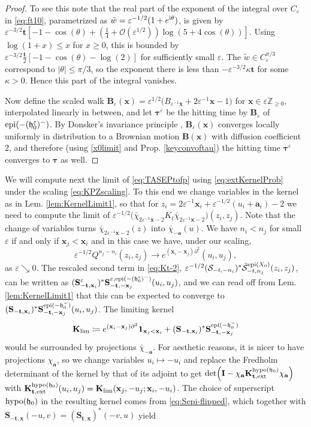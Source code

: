 \documentclass[letterpaper,reqno,11pt,oneside,final]{amsart}
\theoremstyle{definition}
\newcommand{\fh}{\mathfrak{h}}
\newcommand{\I}{\uptext{i}}
\newcommand{\zz}{\mathbb{Z}}
\newcommand{\p}{\partial}
\newcommand{\uno}[1]{\mathbf{1}_{#1}}
\newcommand{\ep}{\varepsilon}
\newcommand{\uptext}[1]{\text{\upshape{#1}}}
\DeclareMathOperator{\epi}{\uptext{epi}}
\DeclareMathOperator{\oepi}{\epi}
\DeclareMathOperator{\hypo}{\uptext{hypo}}
\newcommand{\SM}{\mathcal{S}}
\newcommand{\SN}{\bar{\mathcal{S}}}
\newcommand{\fT}{\mathbf{S}}
\newcommand{\ft}{\mathbf{t}}
\newcommand{\fx}{\mathbf{x}}
\newcommand{\fa}{\mathbf{a}}
\newcommand{\fB}{\mathbf{B}}
\newcommand{\fK}{\mathbf{K}}
\newcommand{\fI}{\mathbf{I}}
\newcommand{\ftau}{\bm{\tau}}
\numberwithin{equation}{section}
\begin{document}
\begin{proof}
To see this note that the real part of the exponent of the integral over $C_\ep$ in \eqref{eq:ft10}, parametrized as $\tilde w=\ep^{-1/2}(1+e^{\I\theta})$, is given by $\ep^{-3/2}\ft[-1-\cos(\theta) + (\tfrac14+\mathcal{O}(\ep^{1/2}))\log(5+4\cos(\theta))]$.
Using $\log(1+x) \le x$ for $x\ge 0$, this is bounded by $\ep^{-3/2}\tfrac{\ft}2[-1-\cos(\theta)-\log(2)]$ for sufficiently small $\ep$.
The $\tilde{w}\in C^{\pi/3}_\ep$ correspond to $|\theta|\leq\pi/3$, so the exponent there is less than $-\ep^{-3/2}\kappa\ft$ for some $\kappa>0$.
Hence this part of the integral vanishes.

Now define the scaled walk $\fB_\ep(\fx) = \ep^{1/2}\big(B_{\ep^{-1}\fx} + 2\ep^{-1}\fx-1\big)$ for $\fx\in \ep\zz_{\geq0}$, interpolated linearly in between, and let $\ftau^\ep$ be the hitting time by $\fB_\ep$ of $\epi(-(\fh_0^\ep)^-)$.
By Donsker's invariance principle \cite{billingsley}, $\fB_\ep(\fx)$ converges locally uniformly in distribution to a Brownian motion $\fB(\fx)$ with diffusion coefficient $2$, and therefore (using \eqref{x0limit} and Prop. \ref{keyconvoftau}) the hitting time $\ftau^\ep$ converges to $\ftau$ as well.
\end{proof}

We will compute next the limit of \eqref{eq:TASEPtofp} using \eqref{eq:extKernelProb} under the scaling \eqref{eq:KPZscaling}.
To this end we change variables in the kernel as in Lem. \ref{lem:KernelLimit1}, so that for $z_i=2\ep^{-1}\fx_i+\ep^{-1/2}(u_i+\fa_i)-2$ we need to compute the limit of $\ep^{-1/2}\big(\bar\chi_{2\ep^{-1}\fx-2}K_t\bar\chi_{2\ep^{-1}\fx-2}\big)(z_i,z_j)$.
Note that the change of variables turns $\bar\chi_{2\ep^{-1}\fx-2}(z)$ into $\bar\chi_{-\fa}(u)$.
We have $n_i<n_j$ for small $\ep$ if and only if $\fx_j<\fx_i$ and in this case we have, under our scaling,
\begin{equation}\label{convergence1}\ep^{-1/2}Q^{n_j-n_i}(z_i,z_j)\longrightarrow e^{(\fx_i-\fx_j)\p^2}(u_i,u_j),\end{equation}
as $\ep\searrow 0$.
The rescaled second term in \eqref{eq:Kt-2}, $\ep^{-1/2}(\SM_{-t,-{n}_i})^*\SN^{\oepi(X_0)}_{-t,n_j}(z_i,z_j)$,  can be written as $(\fT_{-\ft,\fx_i}^\ep)^*\fT^{\ep,\epi(-(\fh_0^\ep)^-)}_{-\ft,-\fx_j}(u_i,u_j)$, and we can read off from Lem. \ref{lem:KernelLimit1} that this can be expected to converge to $(\fT_{-\ft,\fx_i})^*\fT^{\epi(-\fh_0^-)}_{-\ft,-\fx_j}(u_i,u_j)$.
The limiting kernel 
\begin{equation}
 \fK_{\lim}\coloneqq e^{(\fx_i-\fx_j)\p^2}\uno{\fx_j<\fx_i}+(\fT_{-\ft,\fx_i})^*\fT^{\epi(-\fh_0^-)}_{-\ft,-\fx_j}\label{eq:Klim}
\end{equation}
would be surrounded by projections $\bar\chi_{-\fa}$.
For aesthetic reasons, it is nicer to have projections $\chi_{\fa}$, so we change variables $u_i\longmapsto-u_i$ and replace the Fredholm determinant of the kernel by that of its adjoint to get 
$\det\!\left(\fI-\chi_{\fa}\fK^{\hypo(\fh_0)}_{\ft,\uptext{ext}}\chi_{\fa}\right)$ with $
\fK^{\hypo(\fh_0)}_{\ft,\uptext{ext}}(u_i,u_j)=\fK_{\lim}(\fx_j,-u_j;\fx_i,-u_i)$.
The choice of superscript $\hypo(\fh_0)$ in the resulting kernel comes from  \eqref{eq:Sepi-flipped}, which together with $\fT_{-\ft,\fx}(-u,v)=(\fT_{\ft,\fx})^*(-v,u)$ yield
\end{document}
